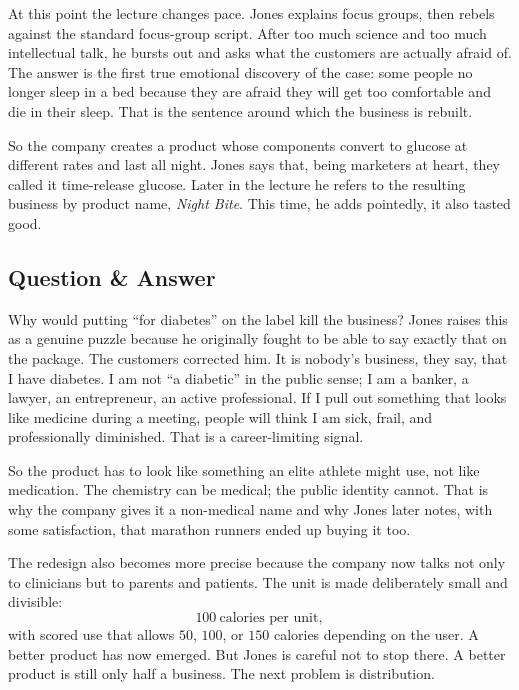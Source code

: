 At this point the lecture changes pace. Jones explains focus groups, then rebels against the standard focus-group script. After too much science and too much intellectual talk, he bursts out and asks what the customers are actually afraid of. The answer is the first true emotional discovery of the case: some people no longer sleep in a bed because they are afraid they will get too comfortable and die in their sleep. That is the sentence around which the business is rebuilt.

So the company creates a product whose components convert to glucose at different rates and last all night. Jones says that, being marketers at heart, they called it time-release glucose. Later in the lecture he refers to the resulting business by product name, \emph{Night Bite}. This time, he adds pointedly, it also tasted good.

\subsection{Question \& Answer}

Why would putting ``for diabetes'' on the label kill the business? Jones raises this as a genuine puzzle because he originally fought to be able to say exactly that on the package. The customers corrected him. It is nobody's business, they say, that I have diabetes. I am not ``a diabetic'' in the public sense; I am a banker, a lawyer, an entrepreneur, an active professional. If I pull out something that looks like medicine during a meeting, people will think I am sick, frail, and professionally diminished. That is a career-limiting signal.

So the product has to look like something an elite athlete might use, not like medication. The chemistry can be medical; the public identity cannot. That is why the company gives it a non-medical name and why Jones later notes, with some satisfaction, that marathon runners ended up buying it too.

The redesign also becomes more precise because the company now talks not only to clinicians but to parents and patients. The unit is made deliberately small and divisible:
\begin{equation}
100\ \text{calories per unit},
\end{equation}
with scored use that allows \(50\), \(100\), or \(150\) calories depending on the user. A better product has now emerged. But Jones is careful not to stop there. A better product is still only half a business. The next problem is distribution.

